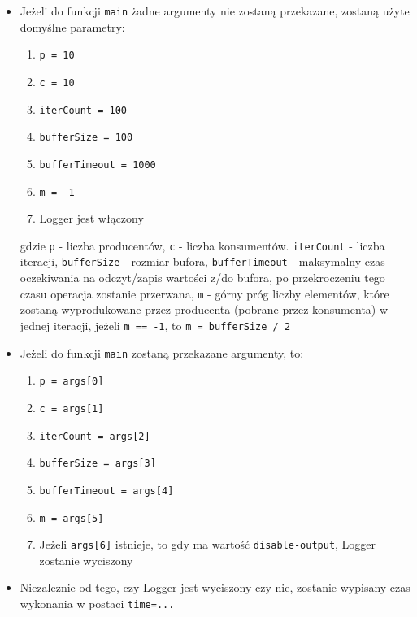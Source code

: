 \documentclass[11pt]{article}
\providecommand{\tightlist}{%
      \setlength{\itemsep}{0pt}\setlength{\parskip}{0pt}}
\begin{document}
\begin{itemize}
\item
  Jeżeli do funkcji \texttt{main} żadne argumenty nie zostaną
  przekazane, zostaną użyte domyślne parametry:

  \begin{enumerate}
  \def\labelenumi{\arabic{enumi}.}
  \tightlist
  \item
    \texttt{p\ =\ 10}
  \item
    \texttt{c\ =\ 10}
  \item
    \texttt{iterCount\ =\ 100}
  \item
    \texttt{bufferSize\ =\ 100}
  \item
    \texttt{bufferTimeout\ =\ 1000}
  \item
    \texttt{m\ =\ -1}
  \item
    Logger jest włączony
  \end{enumerate}

  gdzie \texttt{p} - liczba producentów, \texttt{c} - liczba
  konsumentów. \texttt{iterCount} - liczba iteracji, \texttt{bufferSize}
  - rozmiar bufora, \texttt{bufferTimeout} - maksymalny czas oczekiwania
  na odczyt/zapis wartości z/do bufora, po przekroczeniu tego czasu
  operacja zostanie przerwana, \texttt{m} - górny próg liczby elementów,
  które zostaną wyprodukowane przez producenta (pobrane przez
  konsumenta) w jednej iteracji, jeżeli \texttt{m\ ==\ -1}, to
  \texttt{m\ =\ bufferSize\ /\ 2}
\item
  Jeżeli do funkcji \texttt{main} zostaną przekazane argumenty, to:

  \begin{enumerate}
  \def\labelenumi{\arabic{enumi}.}
  \tightlist
  \item
    \texttt{p\ =\ args{[}0{]}}
  \item
    \texttt{c\ =\ args{[}1{]}}
  \item
    \texttt{iterCount\ =\ args{[}2{]}}
  \item
    \texttt{bufferSize\ =\ args{[}3{]}}
  \item
    \texttt{bufferTimeout\ =\ args{[}4{]}}
  \item
    \texttt{m\ =\ args{[}5{]}}
  \item
    Jeżeli \texttt{args{[}6{]}} istnieje, to gdy ma wartość
    \texttt{disable-output}, Logger zostanie wyciszony
  \end{enumerate}
\item
  Niezaleznie od tego, czy Logger jest wyciszony czy nie, zostanie
  wypisany czas wykonania w postaci \texttt{time=...}
\end{itemize}
\end{document}
